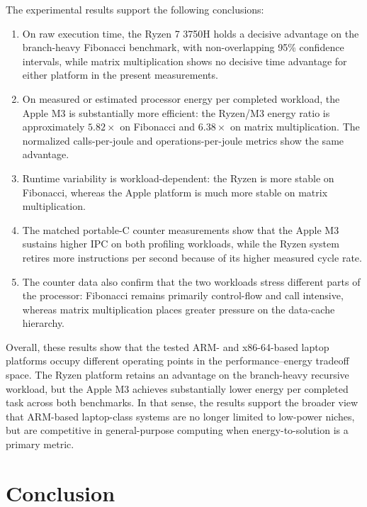 \documentclass{tcsa}
\begin{document}
The experimental results support the following conclusions:

\begin{enumerate}
  \item On raw execution time, the Ryzen 7 3750H holds a decisive
        advantage on the branch-heavy Fibonacci benchmark, with
        non-overlapping 95\% confidence intervals, while matrix
        multiplication shows no decisive time advantage for either
        platform in the present measurements.
  \item On measured or estimated processor energy per completed workload, the Apple M3 is
        substantially more efficient: the Ryzen/M3 energy ratio is
        approximately $5.82\times$ on Fibonacci and $6.38\times$ on
        matrix multiplication. The normalized calls-per-joule and
        operations-per-joule metrics show the same advantage.
  \item Runtime variability is workload-dependent: the Ryzen is more
        stable on Fibonacci, whereas the Apple platform is much more
        stable on matrix multiplication.
  \item The matched portable-C counter measurements show that the Apple
        M3 sustains higher IPC on both profiling workloads, while the
        Ryzen system retires more instructions per second because of
        its higher measured cycle rate.
  \item The counter data also confirm that the two workloads stress
        different parts of the processor: Fibonacci remains primarily
        control-flow and call intensive, whereas matrix multiplication
        places greater pressure on the data-cache hierarchy.
\end{enumerate}

Overall, these results show that the tested ARM- and x86-64-based
laptop platforms occupy different operating points in the
performance--energy tradeoff space. The Ryzen platform retains an
advantage on the branch-heavy recursive workload, but the Apple M3
achieves substantially lower energy per completed task across both
benchmarks. In that sense, the results support the broader view that
ARM-based laptop-class systems are no longer limited to low-power
niches, but are competitive in general-purpose computing when
energy-to-solution is a primary metric.

\section{Conclusion}
\end{document}
